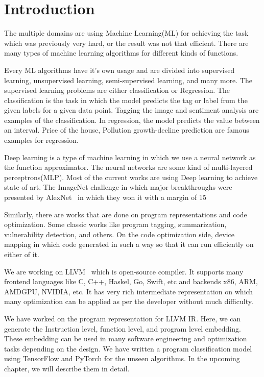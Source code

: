 \chapter{Introduction}
\label{chap:intro}

        The multiple domains are using Machine Learning(ML) for achieving the task which was previously very hard, or the result was not that efficient. There are many types of machine learning algorithms for different kinds of functions.

	    Every ML algorithms have it’s own usage and are divided into supervised learning, unsupervised learning, semi-supervised learning, and many more. The supervised learning problems are either classification or Regression. The classification is the task in which the model predicts the tag or label from the given labels for a given data point. Tagging the image and sentiment analysis are examples of the classification. In regression, the model predicts the value between an interval. Price of the house, Pollution growth-decline prediction are famous examples for regression.
	
	    Deep learning is a type of machine learning in which we use a neural network as the function approximator. The neural networks are some kind of multi-layered perceptrons(MLP). Most of the current works are using Deep learning to achieve state of art. The ImageNet challenge in which major breakthroughs were presented by AlexNet~\cite{alexnet:NIPS_2012} in which they won it with a margin of 15%
	
	    Similarly, there are works that are done on program representations and code optimization. Some classic works like program tagging, summarization, vulnerability detection, and others. On the code optimization side, device mapping in which code generated in such a way so that it can run efficiently on either of it.
	   
	    We are working on LLVM~\cite{Lattner:2004:llvm} which is open-source compiler. It supports many frontend languages like C, C++, Haskel, Go, Swift, etc and backends x86, ARM, AMDGPU, NVIDIA, etc. It has very rich intermediate representation on which many optimization can be applied as per the developer without much difficulty.
	    
	    We have worked on the program representation for LLVM IR. Here, we can generate the Instruction level, function level, and program level embedding. These embedding can be used in many software engineering and optimization tasks depending on the design. We have written a program classification model using TensorFlow\cite{tensorflow2015-whitepaper} and PyTorch\cite{pytorch} for the unseen algorithms. In the upcoming chapter, we will describe them in detail.	
    	
